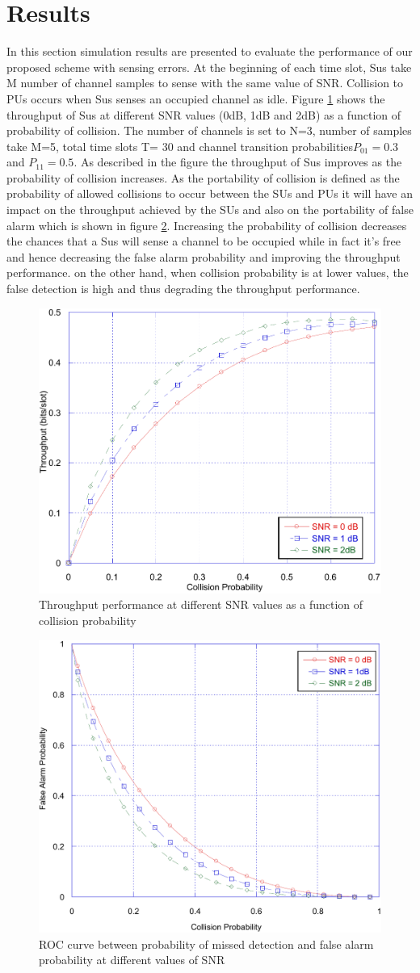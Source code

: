 \documentclass[twocolumn]{el-author}
\begin{document}
	
	
	\section{Results}
In this section simulation results are presented to evaluate the performance of our proposed scheme with sensing errors. At the beginning of each time slot, Sus take M number of channel samples to sense with the same value of SNR. Collision to PUs occurs when Sus senses an occupied channel as idle.
Figure \ref{fig:fig1err} shows the throughput of Sus at different SNR values (0dB, 1dB and 2dB) as a function of probability of collision. The number of channels is set to N=3, number of samples take M=5, total time slots T= 30 and channel transition probabilities$ P_ {01} = 0.3 $ and $P_{11}=0.5$. As described in the figure the throughput of Sus improves as the probability of collision increases. As the portability of collision is defined as the probability of allowed collisions to occur between the SUs and PUs it will have an impact on the throughput achieved by the SUs and also on the portability of false alarm which is shown in figure \ref{fig:fig2err}. Increasing the probability of collision decreases the chances that a Sus will sense a channel to be occupied while in fact it's free and hence decreasing the false alarm probability and improving the throughput performance. on the other hand, when collision probability is at lower values, the false detection is high and thus degrading the throughput performance.
\begin{figure}
	\centering
	\includegraphics[width=0.5\linewidth]{./fig1_err}
	\caption{Throughput performance at different SNR values as a function of collision probability}
	\label{fig:fig1err}
\end{figure}
	\begin{figure}
		\centering
		\includegraphics[width=0.5\linewidth]{./fig2_err}
		\caption{ROC curve between probability of missed detection and false alarm probability at different values of SNR }
		\label{fig:fig2err}
	\end{figure}
\end{document}
